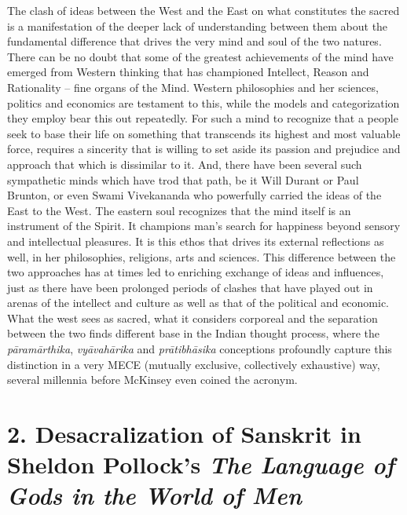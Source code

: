 The clash of ideas between the West and the East on what constitutes the sacred is a manifestation of the deeper lack of understanding between them about the fundamental difference that drives the very mind and soul of the two natures. There can be no doubt that some of the greatest achievements of the mind have emerged from Western thinking that has championed Intellect, Reason and Rationality – fine organs of the Mind. Western philosophies and her sciences, politics and economics are testament to this, while the models and categorization they employ bear this out repeatedly. For such a mind to recognize that a people seek to base their life on something that transcends its highest and most valuable force, requires a sincerity that is willing to set aside its passion and prejudice and approach that which is dissimilar to it. And, there have been several such sympathetic minds which have trod that path, be it Will Durant or Paul Brunton, or even Swami Vivekananda who powerfully carried the ideas of the East to the West. The eastern soul recognizes that the mind itself is an instrument of the Spirit. It champions man’s search for happiness beyond sensory and intellectual pleasures. It is this ethos that drives its external reflections as well, in her philosophies, religions, arts and sciences. This difference between the two approaches has at times led to enriching exchange of ideas and influences, just as there have been prolonged periods of clashes that have played out in arenas of the intellect and culture as well as that of the political and economic. What the west sees as sacred, what it considers corporeal and the separation between the two finds different base in the Indian thought process, where the \textit{pāramārthika}, \textit{vyāvahārika} and \textit{prātibhāsika} conceptions profoundly capture this distinction in a very MECE (mutually exclusive, collectively exhaustive) way, several millennia before McKinsey even coined the acronym.


\section*{2. Desacralization of Sanskrit in Sheldon Pollock’s \textit{The Language of Gods in the World of Men}}

